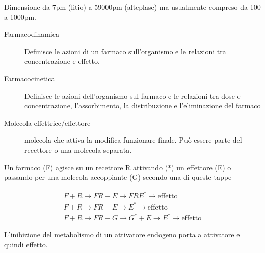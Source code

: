 
Dimensione da 7pm (litio) a 59000pm (alteplase) ma usualmente compreso da 100 a 1000pm.

\begin{description}

\item[Farmacodinamica] Definisce le azioni di un farmaco sull'organismo e le relazioni tra concentrazione e effetto.

\item[Farmacocinetica] Definisce le azioni dell'organismo sul farmaco e le relazioni tra dose e concentrazione, l'assorbimento, la distribuzione e l'eliminazione del farmaco

\item[Molecola effettrice/effettore] molecola che attiva la modifica funzionare finale. Può essere parte del recettore o una molecola separata.
\end{description}

Un farmaco (F) agisce su un recettore R attivando (*) un effettore (E) o passando per una molecola accoppiante (G) secondo una di queste tappe

\begin{eqnarray*}
F + R \longrightarrow FR + E \longrightarrow FRE^* \longrightarrow\text{effetto}\\
F + R \longrightarrow FR + E \longrightarrow E^* \longrightarrow\text{effetto} \\
F + R \longrightarrow FR + G \longrightarrow G^* + E \longrightarrow E^*  \longrightarrow\text{effetto}
\end{eqnarray*}

L'inibizione del metabolismo di un attivatore endogeno porta a \upa attivatore e quindi \upa effetto.


